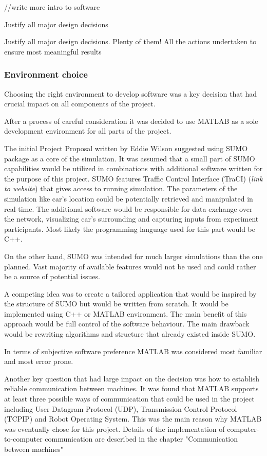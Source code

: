 \documentclass[11pt]{article}
\begin{document}
//write more intro to software







Justify all major design decisions

Justify all major design decisions. Plenty of them!
All the actions undertaken to ensure most meaningful results


\subsubsection{Environment choice}

Choosing the right environment to develop software was a key decision that had crucial impact on all components of the project. 

After a process of careful consideration it was decided to use MATLAB as a sole development environment for all parts of the project. 

The initial Project Proposal written by Eddie Wilson suggested using SUMO package as a core of the simulation. It was assumed that a small part of SUMO capabilities would be utilized in combinations with additional software written for the purpose of this project. SUMO features  Traffic Control Interface (TraCI) (\textit{link to website}) that gives access to running simulation. The parameters of the simulation like car's location could be potentially retrieved and manipulated in real-time. The additional software would be responsible for data exchange over the network, visualizing car's surrounding and capturing inputs from experiment participants. Most likely the programming language used for this part would be C++.


On the other hand, SUMO was intended for much larger simulations than the one planned. Vast majority of available features would not be used and could rather be a source of potential issues. 

A competing idea was to create a tailored application that would be inspired by the structure of SUMO but would be written from scratch. It would be implemented using C++ or MATLAB environment. The main benefit of this approach would be full control of the software behaviour. The main drawback would be rewriting algorithms and structure that already existed inside SUMO. 

In terms of subjective software preference MATLAB was considered most familiar and most error prone.  

Another key question that had large impact on the decision was how to establish reliable communication between machines. 
It was found that MATLAB supports at least three possible ways of communication that could be used in the project including User Datagram Protocol (UDP), Transmission Control Protocol (TCPIP) and Robot Operating System. This was the main reason why MATLAB was eventually chose for this project.
Details of the implementation of computer-to-computer communication are described in the chapter "Communication between machines"
\end{document}

